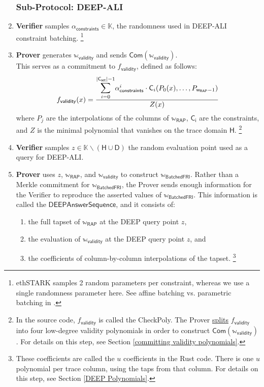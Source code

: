 \documentclass[10pt,letterpaper,titlepage]{article}
\theoremstyle{definition}
\begin{document}
\begin{enumerate}
  \subsubsection{Sub-Protocol: DEEP-ALI}
  \item \textbf{Verifier} samples $\alpha_\mathsf{constraints}\in\mathbb{K}$, the randomness used in DEEP-ALI constraint batching.%
  \footnote{ethSTARK samples 2 random parameters per constraint, whereas we use a single randomness parameter here. See affine batching vs. parametric batching in \cite{FRIsummary}.}
  \item \textbf{Prover} generates $\mathbb{w}_\mathsf{validity}$ and sends $\mathsf{Com}(\mathbb{w}_\mathsf{validity})$. \\
  This serves as a commitment to $f_\mathsf{validity}$, defined as follows:
  \[
    f_\mathsf{validity}(x)=
    \frac{
      \mathlarger{
        \mathlarger{\sum}}_{i=0}^{
          \mathsf{|\mathsf{C_{set}|}}-1
          }
          \alpha_\mathsf{constraints}^i\cdot \mathsf{C}_i(P_0(x),\ldots,P_{\mathsf{w_{RAP}}-1})}
      {Z(x)}
  \] 
  where $P_j$ are the interpolations of the columns of $\mathbb{w}_\mathsf{RAP}$, $\mathsf{C_i}$ are the constraints, and $Z$ is the minimal polynomial that vanishes on the trace domain $\mathsf{H}$.%
  \footnote{
    In the source code, $f_\mathsf{validity}$ is called the CheckPoly. The Prover \hyperref[split]{splits} $f_\mathsf{validity}$ into four low-degree validity polynomials in order to construct $\mathsf{Com}(\mathbb{w}_\mathsf{validity})$. 
    For details on this step, see Section \ref{committing validity polynomials}.
    }
  \item \textbf{Verifier} samples $z\in\mathbb{K}\backslash(\mathsf{H}\cup\mathsf{D})$ the random evaluation point used as a query for DEEP-ALI. 
  \item \textbf{Prover} uses $z$, $\mathbb{w}_\mathsf{RAP}$, and $\mathbb{w}_\mathsf{validity}$ to construct $\mathbb{w}_\mathsf{BatchedFRI}$. 
  Rather than a Merkle commitment for $\mathbb{w}_\mathsf{BatchedFRI}$, the Prover sends enough information for the Verifier to reproduce the asserted values of $\mathbb{w}_\mathsf{BatchedFRI}$. 
  This information is called the $\mathsf{DEEPAnswerSequence}$, and it consists of: 
  \begin{enumerate}
    \item the full tapset of $\mathbb{w}_\mathsf{RAP}$ at the DEEP query point $z$, 
    \item the evaluation of $\mathbb{w}_\mathsf{validity}$ at the DEEP query point $z$, and 
    \item the coefficients of column-by-column interpolations of the tapset.%
    \footnote{
      These coefficients are called the $u$ coefficients in the Rust code. 
      There is one $u$ polynomial per trace column, using the taps from that column.
      For details on this step, see Section \ref{DEEP Polynomials}.
      }
  \end{enumerate}

\end{enumerate}
\end{document}
